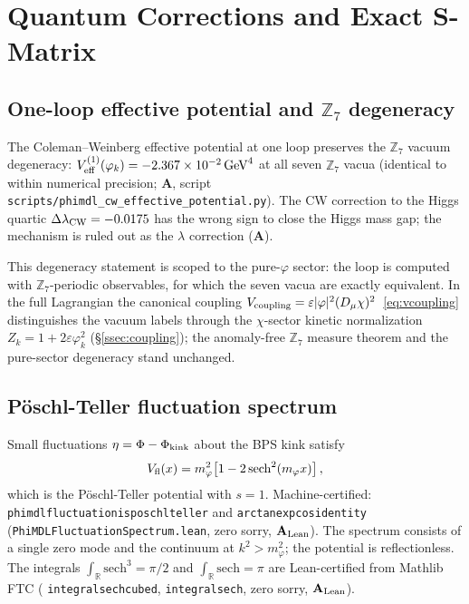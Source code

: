 \documentclass[11pt]{article}
\theoremstyle{remark}
\newcommand{\ZS}{\mathbb{Z}_7}
\newcommand{\lean}[1]{%
  \penalty-100
  \begingroup\def\_{\textunderscore\allowbreak}\texttt{#1}\endgroup}
\newcommand{\CatA}{\textbf{A}}
\newcommand{\CatAL}{\ensuremath{\textbf{A}_{\rm Lean}}}
\begin{document}
\section{Quantum Corrections and Exact S-Matrix}
\label{sec:quantum_corrections}

\subsection{One-loop effective potential and $\mathbb{Z}_7$ degeneracy}
\label{ssec:cw_eff}

The Coleman--Weinberg effective potential at one loop preserves the $\mathbb{Z}_7$
vacuum degeneracy: $V_{\rm eff}^{(1)}(\varphi_k) = -2.367\times10^{-2}\,\text{GeV}^4$
at all seven $\mathbb{Z}_7$ vacua (identical to within numerical precision; $\CatA$,
script \texttt{scripts/phimdl\_cw\_effective\_potential.py}).
The CW correction to the Higgs quartic $\Delta\lambda_{\rm CW} = -0.0175$ has the
wrong sign to close the Higgs mass gap; the mechanism is ruled out as the
$\lambda$ correction ($\CatA$).

This degeneracy statement is scoped to the pure-$\varphi$ sector: the loop is
computed with $\ZS$-periodic observables, for which the seven vacua are
exactly equivalent.  In the full Lagrangian the canonical coupling
$V_{\rm coupling} = \varepsilon|\varphi|^2(D_\mu\chi)^2$~\eqref{eq:vcoupling}
distinguishes the vacuum labels through the $\chi$-sector kinetic
normalization $Z_k = 1 + 2\varepsilon\varphi_k^2$
(\S\ref{ssec:coupling}); the anomaly-free $\ZS$ measure theorem and the
pure-sector degeneracy stand unchanged.

\subsection{Pöschl-Teller fluctuation spectrum}
\label{ssec:pt_spectrum}

Small fluctuations $\eta = \Phi - \Phi_{\rm kink}$ about the BPS kink satisfy
\begin{equation}
  V_{\rm fl}(x) = m_\varphi^2\!\left[1 - 2\,\mathrm{sech}^2(m_\varphi x)\right],
  \label{eq:pt_potential}
\end{equation}
which is the Pöschl-Teller potential with $s = 1$.
Machine-certified: \lean{phimdl\_fluctuation\_is\_poschl\_teller} and
\lean{arctan\_exp\_cos\_identity} (\texttt{PhiMDLFluctuationSpectrum.lean},
zero sorry, $\CatAL$).  The spectrum consists of a single zero mode and the
continuum at $k^2 > m_\varphi^2$; the potential is reflectionless.
The integrals $\int_{\mathbb{R}}\mathrm{sech}^3 = \pi/2$ and $\int_{\mathbb{R}}\mathrm{sech} = \pi$
are Lean-certified from Mathlib FTC (\lean{integral\_sech\_cubed}, \lean{integral\_sech},
zero sorry, $\CatAL$).
\end{document}
